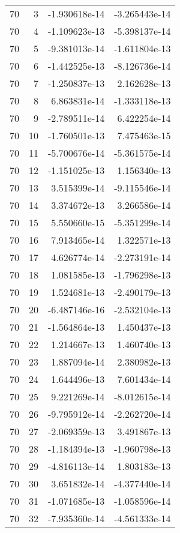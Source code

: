 \begin{tabular}{rrrr}
  70 &    3 & -1.930618e-14 & -3.265443e-14 \\
  70 &    4 & -1.109623e-13 & -5.398137e-14 \\
  70 &    5 & -9.381013e-14 & -1.611804e-13 \\
  70 &    6 & -1.442525e-13 & -8.126736e-14 \\
  70 &    7 & -1.250837e-13 &  2.162628e-13 \\
  70 &    8 &  6.863831e-14 & -1.333118e-13 \\
  70 &    9 & -2.789511e-14 &  6.422254e-14 \\
  70 &   10 & -1.760501e-13 &  7.475463e-15 \\
  70 &   11 & -5.700676e-14 & -5.361575e-14 \\
  70 &   12 & -1.151025e-13 &  1.156340e-13 \\
  70 &   13 &  3.515399e-14 & -9.115546e-14 \\
  70 &   14 &  3.374672e-13 &  3.266586e-14 \\
  70 &   15 &  5.550660e-15 & -5.351299e-14 \\
  70 &   16 &  7.913465e-14 &  1.322571e-13 \\
  70 &   17 &  4.626774e-14 & -2.273191e-14 \\
  70 &   18 &  1.081585e-13 & -1.796298e-13 \\
  70 &   19 &  1.524681e-13 & -2.490179e-13 \\
  70 &   20 & -6.487146e-16 & -2.532104e-13 \\
  70 &   21 & -1.564864e-13 &  1.450437e-13 \\
  70 &   22 &  1.214667e-13 &  1.460740e-13 \\
  70 &   23 &  1.887094e-14 &  2.380982e-13 \\
  70 &   24 &  1.644496e-13 &  7.601434e-14 \\
  70 &   25 &  9.221269e-14 & -8.012615e-14 \\
  70 &   26 & -9.795912e-14 & -2.262720e-14 \\
  70 &   27 & -2.069359e-13 &  3.491867e-13 \\
  70 &   28 & -1.184394e-13 & -1.960798e-13 \\
  70 &   29 & -4.816113e-14 &  1.803183e-13 \\
  70 &   30 &  3.651832e-14 & -4.377440e-14 \\
  70 &   31 & -1.071685e-13 & -1.058596e-14 \\
  70 &   32 & -7.935360e-14 & -4.561333e-14 \\

\end{tabular}
